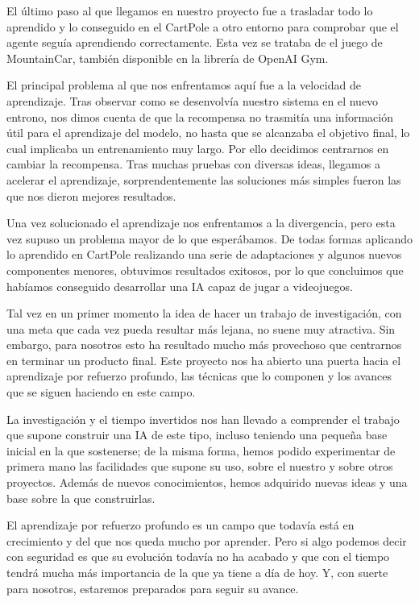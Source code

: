 El último paso al que llegamos en nuestro proyecto fue a trasladar todo lo aprendido y lo conseguido en el CartPole a otro entorno para comprobar que el agente seguía aprendiendo correctamente. Esta vez se trataba de el juego de MountainCar, también disponible en la librería de OpenAI Gym. 

El principal problema al que nos enfrentamos aquí fue a la velocidad de aprendizaje. Tras observar como se desenvolvía nuestro sistema en el nuevo entrono, nos dimos cuenta de que la recompensa no trasmitía una información útil para el aprendizaje del modelo, no hasta que se alcanzaba el objetivo final, lo cual implicaba un entrenamiento muy largo. Por ello decidimos centrarnos en cambiar la recompensa. Tras muchas pruebas con diversas ideas, llegamos a acelerar el aprendizaje, sorprendentemente las soluciones más simples fueron las que nos dieron mejores resultados.  

Una vez solucionado el aprendizaje nos enfrentamos a la divergencia, pero esta vez supuso un problema mayor de lo que esperábamos. De todas formas aplicando lo aprendido en CartPole realizando una serie de adaptaciones y algunos nuevos componentes menores, obtuvimos resultados exitosos, por lo que concluimos que habíamos conseguido desarrollar una IA capaz de jugar a videojuegos.


Tal vez en un primer momento la idea de hacer un trabajo de investigación, con una meta que cada vez pueda resultar más lejana, no suene muy atractiva. Sin embargo, para nosotros esto ha resultado mucho más provechoso que centrarnos en terminar un producto final. Este proyecto nos ha abierto una puerta hacia el aprendizaje por refuerzo profundo, las técnicas que lo componen y los avances que se siguen haciendo en este campo. 

La investigación y el tiempo invertidos nos han llevado a comprender el trabajo que supone construir una IA de este tipo, incluso teniendo una pequeña base inicial en la que sostenerse; de la misma forma, hemos podido experimentar de primera mano las facilidades que supone su uso, sobre el nuestro y sobre otros proyectos. Además de nuevos conocimientos, hemos adquirido nuevas ideas y una base sobre la que construirlas. 

El aprendizaje por refuerzo profundo es un campo que todavía está en crecimiento y del que nos queda mucho por aprender. Pero si algo podemos decir con seguridad es que su evolución todavía no ha acabado y que con el tiempo tendrá mucha más importancia de la que ya tiene a día de hoy. Y, con suerte para nosotros, estaremos preparados para seguir su avance.

